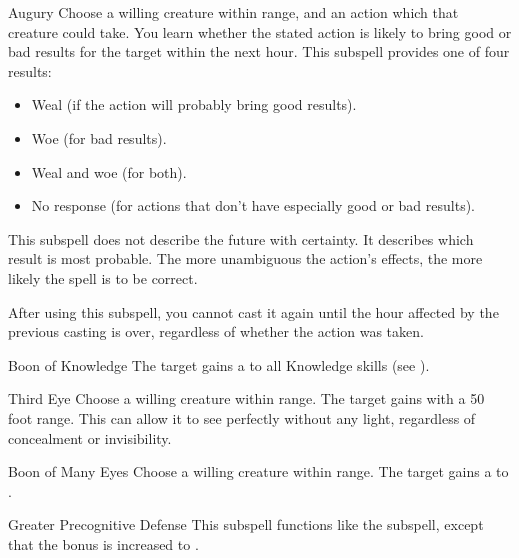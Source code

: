 \begin{ability}[\nth{3}]{Augury}
Choose a willing creature within \rngclose range, and an action which that creature could take.
You learn whether the stated action is likely to bring good or bad results for the target within the next hour.
This subspell provides one of four results:
\begin{itemize}
\item Weal (if the action will probably bring good results).
\item Woe (for bad results).
\item Weal and woe (for both).
\item No response (for actions that don't have especially good or bad results).
\end{itemize}

This subspell does not describe the future with certainty.
It describes which result is most probable.
The more unambiguous the action's effects, the more likely the spell is to be correct.

After using this subspell, you cannot cast it again until the hour affected by the previous casting is over, regardless of whether the action was taken.
\end{ability}
\vspace{0.25em}


\begin{ability}[\nth{3}]{Boon of Knowledge}
The target gains a   to all Knowledge skills (see ).
\end{ability}
\vspace{0.25em}


\begin{ability}[\nth{3}]{Third Eye}
Choose a willing creature within \rngclose range.
The target gains  with a 50 foot range.
This can allow it to see perfectly without any light, regardless of concealment or invisibility.
\end{ability}
\vspace{0.25em}


\begin{ability}[\nth{4}]{Boon of Many Eyes}
Choose a willing creature within \rngclose range.
The target gains a   to .
\end{ability}
\vspace{0.25em}


\begin{ability}[\nth{5}]{Greater Precognitive Defense}
This subspell functions like the  subspell, except that the bonus is increased to .
\end{ability}
\vspace{0.25em}


